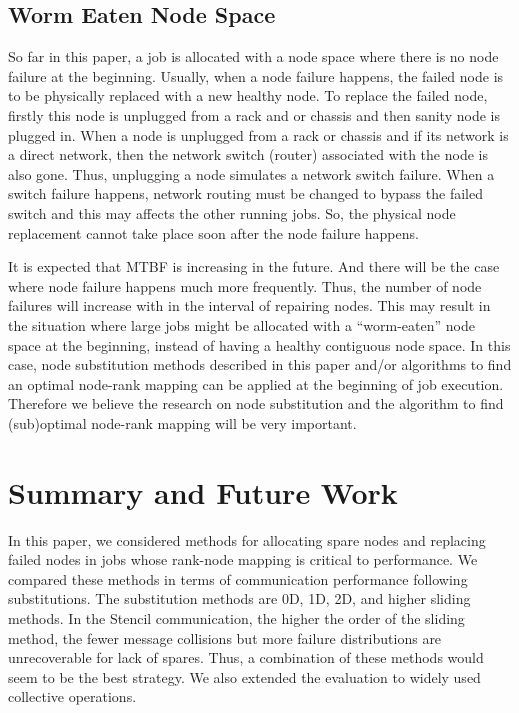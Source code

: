 \documentclass[Afour,times,sagev]{sagej}
\begin{document}
\subsection{Worm Eaten Node Space}

So far in this paper, a job is allocated with a node space where there
is no node failure at the beginning. Usually, when a node failure
happens, the failed node is to be physically replaced with a new healthy
node. To replace the failed node, firstly this node is unplugged from
a rack and or chassis and then sanity node is plugged in. When a node
is unplugged from a rack or chassis and if its network is a direct
network, then the network switch (router) associated with the node is
also gone. Thus, unplugging a node simulates a network switch
failure. When a switch failure happens, network routing must be
changed to bypass the failed switch and this may affects the other
running jobs. So, the physical node replacement cannot take place soon
after the node failure happens. 

It is expected that MTBF is increasing in the future. And there will
be the case where node failure happens much more frequently. Thus, the
number of node failures will increase with in the interval of
repairing nodes. This may result in the situation where large jobs
might be allocated with a ``worm-eaten'' node space at the beginning,
instead of having a healthy contiguous node space. In this case, node
substitution methods described in this paper and/or algorithms to find
an optimal node-rank mapping can be applied at the beginning of job
execution. Therefore we believe the research on node substitution and
the algorithm to find (sub)optimal node-rank mapping will be very
important. 

\section{Summary and Future Work}

In this paper, we considered methods for allocating spare nodes and
replacing failed nodes in jobs whose rank-node mapping is critical to
performance. We compared these methods in terms of
communication performance following substitutions. The substitution
methods are 0D, 1D, 2D, and higher sliding methods. In the Stencil 
communication, the higher the order of the sliding method, the fewer
message collisions but more failure distributions are unrecoverable
for lack of spares. Thus, a combination of these methods would seem
to be the best strategy. We also extended the evaluation to widely
used collective operations. 
\end{document}
